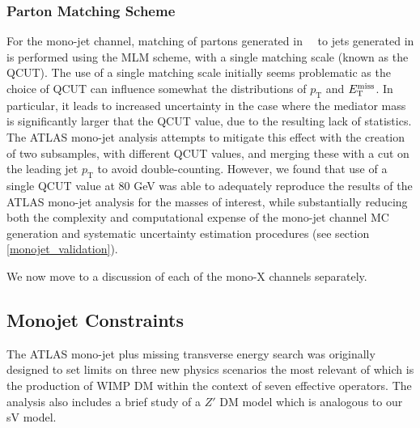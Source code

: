 \subsubsection{Parton Matching Scheme}
\label{matching_procedure}
For the mono-jet channel, matching of partons generated in \MG$\mbox{ }$ to jets generated in \PYTHIA is performed using the MLM scheme, with a single matching scale (known as the QCUT). The use of a single matching scale initially seems problematic as the choice of QCUT can influence somewhat the distributions of $p_{\mathrm{T}}$ and $E_{\mathrm{T}}^{\mathrm{miss}}$. In particular, it leads to increased uncertainty in the case where the mediator mass is significantly larger that the QCUT value, due to the resulting lack of statistics. The ATLAS mono-jet analysis attempts to mitigate this effect with the creation of two subsamples, with different QCUT values, and merging these with a cut on the leading jet $p_{\mathrm{T}}$ to avoid double-counting. However, we found that use of a single QCUT value at 80 GeV was able to adequately reproduce the results of the ATLAS mono-jet analysis for the masses of interest, while substantially reducing both the complexity and computational expense of the mono-jet channel MC generation and systematic uncertainty estimation procedures (see section \ref{monojet_validation}).

\bigskip
We now move to a discussion of each of the mono-X channels separately.

\subsection{Monojet Constraints}
\label{monojet_constraints}
The ATLAS mono-jet plus missing transverse energy search \cite{Aad:2015zva} was originally designed to set limits on three new physics scenarios\comm{,}
the most relevant of which is the production of WIMP DM within the context of seven  effective operators. The analysis also includes a brief study of a $Z'$ DM model which is analogous to our sV model.

